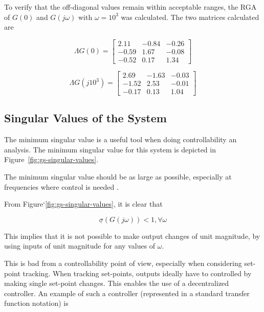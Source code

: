 To verify that the off-diagonal values remain within acceptable ranges, the RGA of $G(0)$ and $G(j\omega)$ with $\omega = 10^3$ was calculated. The two matrices calculated are

\begin{equation}
	\Lambda G(0) = \begin{bmatrix}
	2.11 & -0.84 & -0.26\\
	-0.59 & 1.67 & -0.08\\
	-0.52 & 0.17 & 1.34
	\end{bmatrix}
\end{equation}

\begin{equation}
\Lambda G(j10^3) = \begin{bmatrix}
2.69 & -1.63 & -0.03\\
-1.52 & 2.53 & -0.01\\
-0.17 & 0.13 & 1.04
\end{bmatrix}
\end{equation}

\subsection{Singular Values of the System}

The minimum singular value is a useful tool when doing controllability an analysis. The minimum singular value for this system is depicted in Figure~\ref{fig:gs-singular-values}.

The minimum singular value should be as large as possible, especially at frequencies where control is needed \parencite{skogestad}.

From Figure`\ref{fig:gs-singular-values}, it is clear that

\begin{equation}
	\label{eq: Min singular alue criteria}
	\underline{\sigma}(G(j\omega)) < 1 , \forall \omega
\end{equation}

This implies that it is not possible to make output changes of unit magnitude, by using inputs of unit magnitude for any values of $\omega$. 

This is bad from a controllability point of view, especially when considering set-point tracking. When tracking set-points, outputs ideally have to controlled by making single set-point changes. This enables the use of a decentralized controller. An example of such a controller (represented in a standard transfer function notation) is

